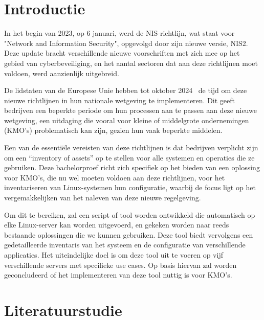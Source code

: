 
\section{Introductie}%
\label{sec:introductie}

In het begin van 2023, op 6 januari, werd de NIS-richtlijn, wat staat voor "Network and Information Security", opgevolgd door zijn nieuwe versie, NIS2.
Deze update bracht verschillende nieuwe voorschriften met zich mee op het gebied van cyberbeveiliging, en het aantal sectoren dat aan deze richtlijnen moet voldoen, werd aanzienlijk uitgebreid.

De lidstaten van de Europese Unie hebben tot oktober 2024~\autocite{NIS2Directive2022} de tijd om deze nieuwe richtlijnen in hun nationale wetgeving te implementeren.
Dit geeft bedrijven een beperkte periode om hun processen aan te passen aan deze nieuwe wetgeving, een uitdaging die vooral voor kleine of middelgrote ondernemingen (KMO's) problematisch kan zijn, gezien hun vaak beperkte middelen.

Een van de essenti\"ele vereisten van deze richtlijnen is dat bedrijven verplicht zijn om een ``inventory of assets'' op te stellen voor alle systemen en operaties die ze gebruiken.
Deze bachelorproef richt zich specifiek op het bieden van een oplossing voor KMO's, die nu wel moeten voldoen aan deze richtlijnen, voor het inventariseren van Linux-systemen hun configuratie, waarbij de focus ligt op het vergemakkelijken van het naleven van deze nieuwe regelgeving.

Om dit te bereiken, zal een script of tool worden ontwikkeld die automatisch op elke Linux-server kan worden uitgevoerd, en gekeken worden naar reeds bestaande oplossingen die we kunnen gebruiken.
Deze tool biedt vervolgens een gedetailleerde inventaris van het systeem en de configuratie van verschillende applicaties.
Het uiteindelijke doel is om deze tool uit te voeren op vijf verschillende servers met specifieke use cases.
Op basis hiervan zal worden geconcludeerd of het implementeren van deze tool nuttig is voor KMO's.


\section{Literatuurstudie}%
\label{sec:litaratuurstudie}

